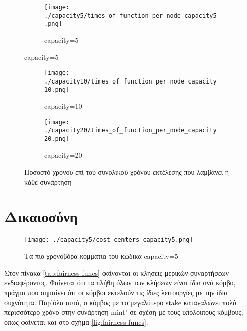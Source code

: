 \documentclass{article}
\newcommand{\eng}[1]{\foreignlanguage{english}{#1}} %
\begin{document}
\begin{figure}[ht]
    \centering
    \begin{subfigure}{\textwidth}
        \texttt{[image: ./capacity5/times\_of\_function\_per\_node\_capacity5.png]}
        \caption{\eng{capacity=5}}
    \end{subfigure}
\end{figure}
\begin{figure}[ht]
    \ContinuedFloat
    \begin{subfigure}{\textwidth}
        \texttt{[image: ./capacity10/times\_of\_function\_per\_node\_capacity10.png]}
        \caption{\eng{capacity=10}}
    \end{subfigure}
    \centering
    \begin{subfigure}{\textwidth}
        \texttt{[image: ./capacity20/times\_of\_function\_per\_node\_capacity20.png]}
        \caption{\eng{capacity=20}}
    \end{subfigure}
    \caption{Ποσοστό χρόνου επί του συνολικού χρόνου εκτέλεσης που λαμβάνει η κάθε συνάρτηση}
\end{figure}
\FloatBarrier

\section{Δικαιοσύνη}

\graphicspath{{../experiments/profiled\_outputs/fairnessdel100ms/}}

\begin{figure}[ht]
    \centering
    \texttt{[image: ./capacity5/cost-centers-capacity5.png]}
    \caption{Τα πιο χρονοβόρα κομμάτια του κώδικα \eng{capacity=5}}
    \label{fig:fairness-cost-centers}
\end{figure}

Στον πίνακα \ref{tab:fairness-funcs} φαίνονται οι κλήσεις μερικών συναρτήσεων
ενδιαφέροντος. Φαίνεται ότι τα πλήθη όλων των κλήσεων είναι ίδια ανά κόμβο,
πράγμα που σημαίνει ότι οι κόμβοι εκτελούν τις ίδιες λειτουργίες με την ίδια
συχνότητα. Παρ'όλα αυτά, ο κόμβος με το μεγαλύτερο \eng{stake} καταναλώνει πολύ
περισσότερο χρόνο στην συνάρτηση \eng{mint'} σε σχέση με τους υπόλοιπους
κόμβους, όπως φαίνεται και στο σχήμα \ref{fig:fairness-funcs}.

\begin{table}[ht]
    \centering
    \caption{Στατιστικά συναρτήσεων ανά κόμβο \eng{capacity=5}}
    \label{tab:fairness-funcs}
\end{table}
\end{document}
